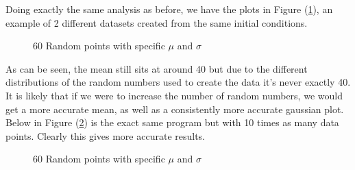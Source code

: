 \documentclass[12pt]{article}
\begin{document}
\begin{itemize}
        Doing exactly the same analysis as before, we have the plots in Figure (\ref{fig:RandomDataHistograms60}), 
        an example of 2 different datasets created from the same initial conditions.

        \begin{figure}[H]%
            \centering
            \subfloat{\scalebox{0.45}{}}%
            \qquad
            \subfloat{\scalebox{0.45}{}}%
            \caption{60 Random points with specific $\mu$ and $\sigma$}
            \label{fig:RandomDataHistograms60}
        \end{figure}
        
        \noindent
        As can be seen, the mean still sits at around 40 but due to the different distributions of 
        the random numbers used to create the data it's never exactly 40. It is likely that if we 
        were to increase the number of random numbers, we would get a more accurate mean, as well as 
        a consistently more accurate gaussian plot. Below in Figure (\ref{fig:RandomDataHistograms600}) 
        is the exact same program but with 10 times as many data points. Clearly this gives more 
        accurate results.

        \begin{figure}[H]%
            \centering
            \subfloat{\scalebox{0.45}{}}%
            \qquad
            \subfloat{\scalebox{0.45}{}}%
            \caption{60 Random points with specific $\mu$ and $\sigma$}
            \label{fig:RandomDataHistograms600}
        \end{figure}


\end{itemize}
\end{document}
